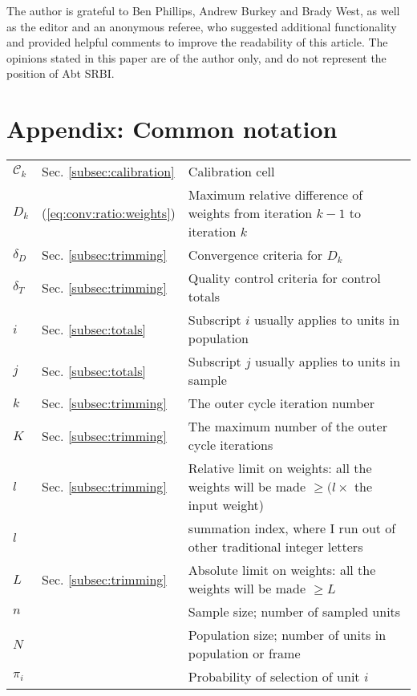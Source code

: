 The author is grateful to Ben Phillips, Andrew Burkey and Brady West,
as well as the editor and an anonymous referee,
who suggested additional functionality and provided helpful comments
to improve the readability of this article. The opinions stated in this paper
are of the author only, and do not represent the position of Abt SRBI.


% 


\appendix

\section*{Appendix: Common notation}

\begin{tabular}{llp{9.5cm}}
    $\mathcal{C}_k$ & Sec. \ref{subsec:calibration} & Calibration cell \\
    $D_k$ & (\ref{eq:conv:ratio:weights}) & Maximum relative difference of weights
            from iteration $k-1$ to iteration $k$ \\
    $\delta_D$ & Sec. \ref{subsec:trimming} & Convergence criteria for $D_k$ \\
    $\delta_T$ & Sec. \ref{subsec:trimming} & Quality control criteria for control totals \\
    $i$ & Sec. \ref{subsec:totals} & Subscript $i$ usually applies to units in population \\
    $j$ & Sec. \ref{subsec:totals} & Subscript $j$ usually applies to units in sample \\
    $k$ & Sec. \ref{subsec:trimming} & The outer cycle iteration number \\
    $K$ & Sec. \ref{subsec:trimming} & The maximum number of the outer cycle iterations \\
    $l$ & Sec. \ref{subsec:trimming} & Relative limit on weights: all the weights will be made
        $\ge (l \times$ the input weight) \\
    $l$ & & summation index, where I run out of other traditional integer letters \\
    $L$ & Sec. \ref{subsec:trimming} & Absolute limit on weights: all the weights will be made
        $\ge L$ \\
    $n$ & & Sample size; number of sampled units \\
    $N$ & & Population size; number of units in population or frame \\
    $\pi_i$ & & Probability of selection of unit $i$

\end{tabular}
